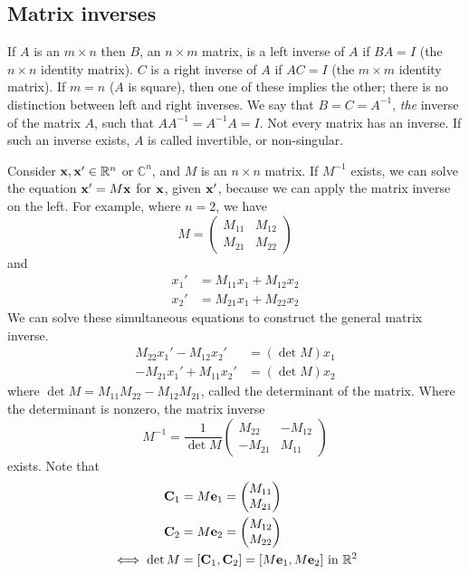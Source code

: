 \subsection{Matrix inverses}
If \(A\) is an \(m \times n\) then \(B\), an \(n \times m\) matrix, is a left inverse of \(A\) if \(BA = I\) (the \(n \times n\) identity matrix).
\(C\) is a right inverse of \(A\) if \(AC = I\) (the \(m \times m\) identity matrix).
If \(m = n\) (\(A\) is square), then one of these implies the other; there is no distinction between left and right inverses.
We say that \(B = C = A^{-1}\), \textit{the} inverse of the matrix \(A\), such that \(AA^{-1} = A^{-1}A = I\).
Not every matrix has an inverse.
If such an inverse exists, \(A\) is called invertible, or non-singular.

Consider \(\vb x, \vb x' \in \mathbb R^n\) or \(\mathbb C^n\), and \(M\) is an \(n \times n\) matrix.
If \(M^{-1}\) exists, we can solve the equation \(\vb x' = M \vb x\) for \(\vb x\), given \(\vb x'\), because we can apply the matrix inverse on the left.
For example, where \(n=2\), we have
\[
	M = \begin{pmatrix}
		M_{11} & M_{12} \\
		M_{21} & M_{22}
	\end{pmatrix}
\]
and
\begin{align*}
	x_1' & = M_{11}x_1 + M_{12}x_2 \\
	x_2' & = M_{21}x_1 + M_{22}x_2
\end{align*}
We can solve these simultaneous equations to construct the general matrix inverse.
\begin{align*}
	M_{22} x_1' - M_{12}x_2'  & = (\det M)x_1 \\
	-M_{21} x_1' + M_{11}x_2' & = (\det M)x_2
\end{align*}
where \(\det M = M_{11} M_{22} - M_{12} M_{21}\), called the determinant of the matrix.
Where the determinant is nonzero, the matrix inverse
\[
	M^{-1} = \frac{1}{\det M}\begin{pmatrix}
		M_{22}  & -M_{12} \\
		-M_{21} & M_{11}
	\end{pmatrix}
\]
exists.
Note that
\begin{align*}
	\vb C_1     & = M \vb e_1 = \begin{pmatrix} M_{11} \\ M_{21} \end{pmatrix}                            \\
	\vb C_2     & = M \vb e_2 = \begin{pmatrix} M_{12} \\ M_{22} \end{pmatrix}                            \\
	\iff \det M & = [\vb C_1, \vb C_2] = [M\vb e_1, M\vb e_2] \text{ in } \mathbb R^2
\end{align*}
